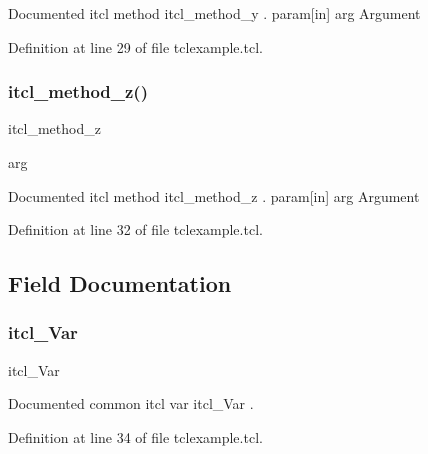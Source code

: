 Documented itcl method {\ttfamily itcl\+\_\+method\+\_\+y} . param\mbox{[}in\mbox{]} arg Argument 

Definition at line 29 of file tclexample.\+tcl.

\mbox{\label{classns_1_1itcl__class_a173dffcfe26dd79837a07bbdcf68b0ca}} 
\subsubsection{\texorpdfstring{itcl\+\_\+method\+\_\+z()}{itcl\_method\_z()}}
{\footnotesize\ttfamily itcl\+\_\+method\+\_\+z\begin{DoxyParamCaption}\item[{}]{arg  }\end{DoxyParamCaption}}

Documented itcl method {\ttfamily itcl\+\_\+method\+\_\+z} . param\mbox{[}in\mbox{]} arg Argument 

Definition at line 32 of file tclexample.\+tcl.



\subsection{Field Documentation}
\mbox{\label{classns_1_1itcl__class_ad36615943b6e0b072f672602111414e7}} 
\subsubsection{\texorpdfstring{itcl\+\_\+\+Var}{itcl\_Var}}
{\footnotesize\ttfamily itcl\+\_\+\+Var\hspace{0.3cm}{\ttfamily [static]}}

Documented common itcl var {\ttfamily itcl\+\_\+\+Var} . 

Definition at line 34 of file tclexample.\+tcl.

\mbox{\label{classns_1_1itcl__class_a1cf74cf501971e5432041e21fd6968a3}} 
